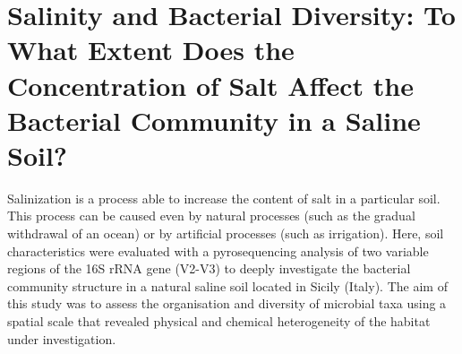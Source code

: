 \section{Salinity and Bacterial Diversity: To What Extent Does the Concentration of Salt Affect the Bacterial Community in a Saline Soil?}
Salinization is a process able to increase the content of salt in a particular soil. This process can be caused even by natural processes (such as the gradual withdrawal of an ocean) or by artificial processes (such as irrigation). Here, soil characteristics were evaluated with a pyrosequencing analysis of two variable regions of the 16S rRNA gene (V2-V3) to deeply investigate the bacterial community structure in a natural saline soil located in Sicily (Italy). The aim of this study was to assess the organisation and diversity of microbial taxa using a spatial scale that revealed physical and chemical heterogeneity of the habitat under investigation.\\

\newpage

\newpage


\backmatter
{}
\renewcommand{\sectionmark}[1]{\markright{#1}}
\sectionmark{Bibliography}
